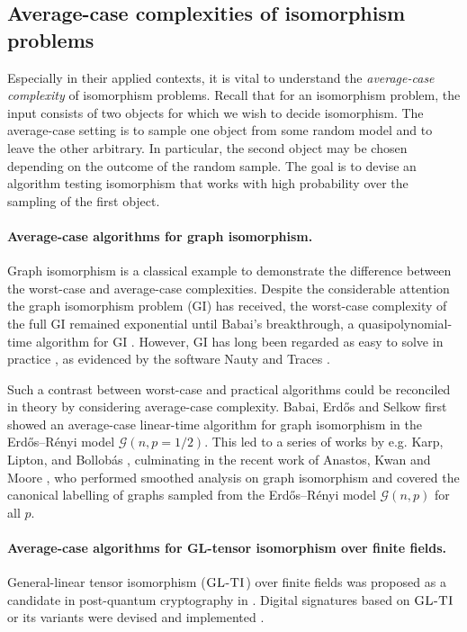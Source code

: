 \documentclass[11pt]{article}
\numberwithin{equation}{section}
\theoremstyle{remark}
\newcommand{\GLTI}{\textsc{GL-TI}}
\begin{document}
\subsection{Average-case complexities of isomorphism problems}\label{subsec:average-case}

Especially in their applied contexts, it is vital to understand the \emph{average-case complexity} of isomorphism problems. Recall that for an isomorphism problem, the input consists of two objects for which we wish to decide isomorphism. The average-case setting is to sample one object from some random model and to leave the other arbitrary. In particular, the second object may be chosen depending on the outcome of the random sample. The goal is to devise an algorithm testing isomorphism that works with high probability over the sampling of the first object. 

\paragraph{Average-case algorithms for graph isomorphism.}
Graph isomorphism is a classical example to demonstrate the difference between the worst-case and average-case complexities.
Despite the considerable attention the graph isomorphism problem (GI) has received, the worst-case complexity of the full GI remained exponential \cite{BL83} until Babai's breakthrough, a quasipolynomial-time algorithm for GI \cite{Bab16}. However, GI has long been regarded as easy to solve in practice \cite{mckay1981practical}, as evidenced by the software Nauty and Traces \cite{mckay2014practical}.

Such a contrast between worst-case and practical algorithms could be reconciled in theory by considering average-case complexity. Babai, Erd\H{o}s and Selkow first showed an average-case linear-time algorithm for graph isomorphism \cite{BES80} in the Erd\H{o}s--R\'enyi model $\mathcal{G}(n, p=1/2)$. This led to a series of works by e.g. Karp, Lipton, and Bollob\'as \cite{karp1975fast,lipton1978beacon,DBLP:conf/focs/BabaiK79,bollobas1982distinguishing,czajka2008improved,linial2017rigidity}, culminating in the recent work of Anastos, Kwan and Moore \cite{anastos2025smoothed}, who performed smoothed analysis on graph isomorphism and covered the canonical labelling of graphs sampled from the Erd\H{o}s--R\'enyi model $\mathcal{G}(n, p)$ for all $p$. 

\paragraph{Average-case algorithms for GL-tensor isomorphism over finite fields.} General-linear tensor isomorphism ($\GLTI$) over finite fields was proposed as a candidate in post-quantum cryptography in \cite{JQSY19}. Digital signatures based on $\GLTI$ or its variants were devised and implemented \cite{ALTEQ-paper,MEDS-paper}. 
\end{document}
